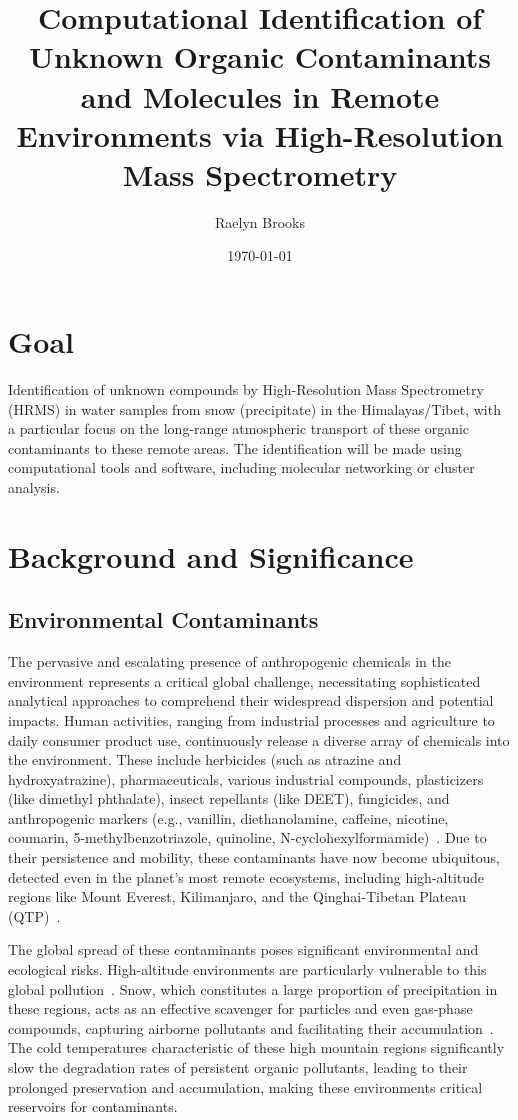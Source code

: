 \documentclass[11pt]{article}
\title{\textbf{Computational Identification of Unknown Organic Contaminants and Molecules in Remote Environments via High-Resolution Mass Spectrometry}}
\author{Raelyn Brooks}
\date{\today}
\begin{document}
\maketitle

\nocite{*}

\begin{doublespace}

\section{Goal}
    Identification of unknown compounds by High-Resolution Mass Spectrometry (HRMS) in water samples from snow (precipitate) in the Himalayas/Tibet, with a particular focus on the long-range atmospheric transport of these organic contaminants to these remote areas. 
    The identification will be made using computational tools and software, including molecular networking or cluster analysis.

\section{Background and Significance}
    \subsection{Environmental Contaminants}
        The pervasive and escalating presence of anthropogenic chemicals in the environment represents a critical global challenge, necessitating sophisticated analytical approaches to comprehend their widespread dispersion and potential impacts.
        Human activities, ranging from industrial processes and agriculture to daily consumer product use, continuously release a diverse array of chemicals into the environment.
        These include herbicides (such as atrazine and hydroxyatrazine), pharmaceuticals, various industrial compounds, plasticizers (like dimethyl phthalate), insect repellants (like DEET), fungicides, and anthropogenic markers (e.g., vanillin, diethanolamine, caffeine, nicotine, coumarin, 5-methylbenzotriazole, quinoline, N-cyclohexylformamide)~\cite{Wenkai}.
        Due to their persistence and mobility, these contaminants have now become ubiquitous, detected even in the planet's most remote ecosystems, including high-altitude regions like Mount Everest, Kilimanjaro, and the Qinghai-Tibetan Plateau (QTP)~\cite{Wenkai}.

        The global spread of these contaminants poses significant environmental and ecological risks. High-altitude environments are particularly vulnerable to this global pollution~\cite{Wenkai}. 
        Snow, which constitutes a large proportion of precipitation in these regions, acts as an effective scavenger for particles and even gas-phase compounds, capturing airborne pollutants and facilitating their accumulation~\cite{Catalan}.
        The cold temperatures characteristic of these high mountain regions significantly slow the degradation rates of persistent organic pollutants, leading to their prolonged preservation and accumulation, making these environments critical reservoirs for contaminants.


\end{doublespace}
\end{document}

